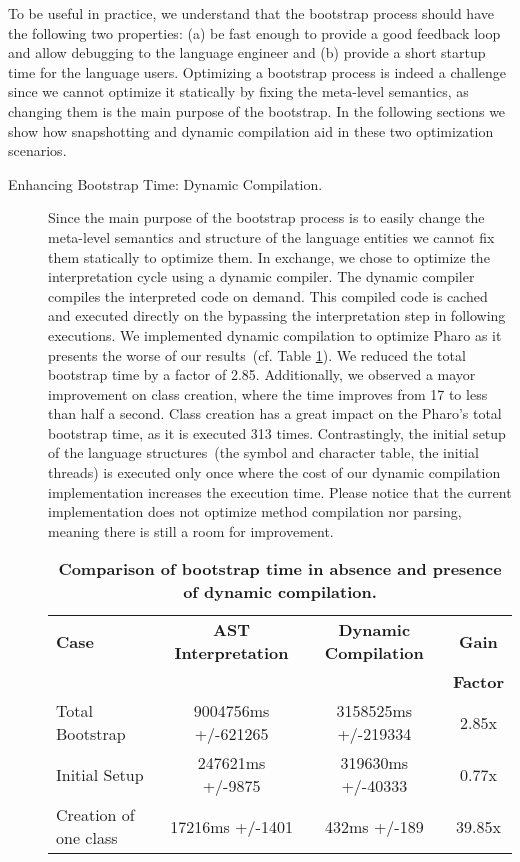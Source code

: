 To be useful in practice, we understand that the bootstrap process should have the following two properties: (a) be fast enough to provide a good feedback loop and allow debugging to the language engineer and (b) provide a short startup time for the language users. Optimizing a bootstrap process is indeed a challenge since we cannot optimize it statically by fixing the meta-level semantics, as changing them is the main purpose of the bootstrap. In the following sections we show how snapshotting and dynamic compilation aid in these two optimization scenarios. 

\begin{description}
\item[Enhancing Bootstrap Time: Dynamic Compilation.]
Since the main purpose of the bootstrap process is to easily change the meta-level semantics and structure of the language entities we cannot fix them statically to optimize them. In exchange, we chose to optimize the interpretation cycle using a dynamic compiler. The dynamic compiler compiles the interpreted code on demand. This compiled code is cached and executed directly on the \VM bypassing the interpretation step in following executions. We implemented dynamic compilation to optimize Pharo as it presents the worse of our results~(cf. Table \ref{tb:dynamic_compilation}). We reduced the total bootstrap time by a factor of 2.85. Additionally, we observed a mayor improvement on class creation, where the time improves from 17 to less than half a second. Class creation has a great impact on the Pharo's total bootstrap time, as it is executed 313 times. Contrastingly, the initial setup of the language structures~(\eg the symbol and character table, the initial threads) is executed only once where the cost of our dynamic compilation implementation increases the execution time. Please notice that the current implementation does not optimize method compilation nor parsing, meaning there is still a room for improvement.

 \begin{table}[ht]
 \small
 	\centering
 	\begin{tabular}{|l|c|c|c|}
			\hline
			\textbf{Case}
 			& \textbf{AST Interpretation}
			& \textbf{Dynamic Compilation}
			& \textbf{Gain}\\
			&&& \textbf{Factor}\\
		\hline
		Total Bootstrap & 9004756ms +/-621265 & 3158525ms +/-219334 & 2.85x\\\hline
 		Initial Setup& 247621ms +/-9875 & 319630ms +/-40333 & 0.77x\\\hline
		Creation of one class & 17216ms +/-1401 & 432ms +/-189 & 39.85x\\\hline
 	\end{tabular}
	\vspace*{0.2cm}
 	\caption{\small\textbf{Comparison of bootstrap time in absence and presence of dynamic compilation.}\label{tb:dynamic_compilation}}
 \end{table}


\end{description}
